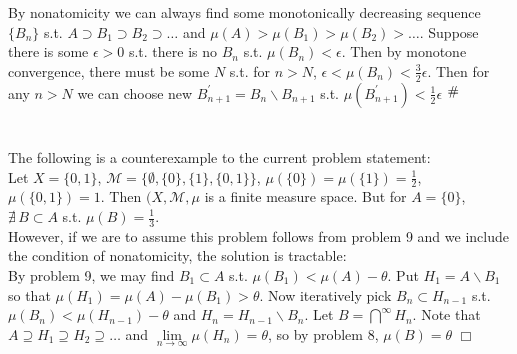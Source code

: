 \documentclass{article}
\newcommand{\contra}{\raisebox{\depth}{\#}}
\begin{document}
\section{}
By nonatomicity we can always find some monotonically decreasing sequence $\{B_n\}$ s.t. $A \supset B_1 \supset B_2 \supset \dots$ and $\mu (A) > \mu (B_1) > \mu (B_2) > \dots$. Suppose there is some $\epsilon > 0$ s.t. there is no $B_n$ s.t. $\mu (B_n) < \epsilon$. Then by monotone convergence, there must be some $N$ s.t. for $n>N$, $\epsilon < \mu (B_n) < \frac{3}{2} \epsilon$. Then for any $n > N$ we can choose new $B_{n+1}^{'} = B_n \backslash B_{n+1}$ s.t. $\mu (B_{n+1}^{'}) < \frac{1}{2} \epsilon$ $\contra$

\section{}
The following is a counterexample to the current problem statement:\\
Let $X = \{ 0,1 \}$, $\mathcal{M} = \{ \emptyset, \{0\}, \{1\}, \{0,1\} \}$, $\mu (\{0\}) = \mu (\{1\}) = \frac{1}{2}$, $\mu (\{0,1\}) = 1$. Then $(X,\mathcal{M},\mu$ is a finite measure space. But for $A = \{0\}$, $\nexists \, B \subset A$ s.t. $\mu (B) = \frac{1}{3}$.\\
However, if we are to assume this problem follows from problem 9 and we include the condition of nonatomicity, the solution is tractable:\\
By problem 9, we may find $B_1 \subset A$ s.t. $\mu (B_1) < \mu (A) - \theta$. Put $H_1 = A \backslash B_1$ so that $\mu (H_1) = \mu (A) - \mu (B_1) > \theta$. Now iteratively pick $B_n \subset H_{n-1}$ s.t. $\mu (B_n) < \mu (H_{n-1}) - \theta$ and $H_n = H_{n-1} \backslash B_n$. Let $B = \bigcap\limits^\infty H_n$. Note that $A \supseteq H_1 \supseteq H_2 \supseteq \dots$ and $\lim\limits_{n\rightarrow\infty} \mu (H_n) = \theta$, so by problem 8, $\mu (B) = \theta$ $\Box$
\end{document}
